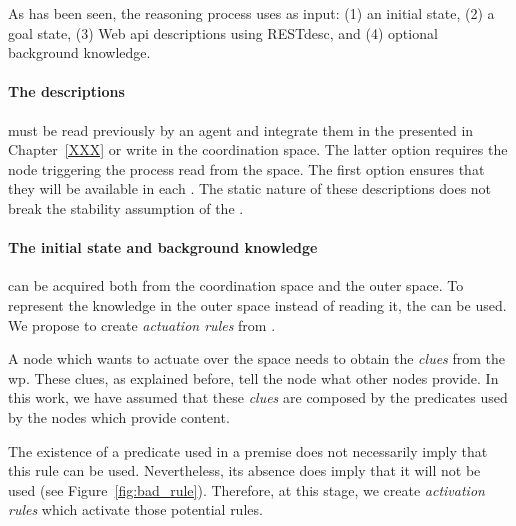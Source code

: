 As has been seen, the reasoning process uses as input:
(1) an initial state,
(2) a goal state,
(3) Web \ac{api} descriptions using RESTdesc, and
(4) optional background knowledge.


\paragraph{The descriptions} must be read previously by an agent and integrate them in the \clues{} presented in Chapter~\ref{XXX} or write in the coordination space.
The latter option requires the node triggering the process read from the space.
The first option ensures that they will be available in each \consumer{}.
The static nature of these descriptions does not break the stability assumption of the \clues{}.


\paragraph{The initial state and background knowledge} can be acquired both from the coordination space and the outer space.
To represent the knowledge in the outer space instead of reading it, the \clues{} can be used.
We propose to create \emph{actuation rules} from \clues{}.


A node which wants to actuate over the space needs to obtain the \emph{clues} from the \ac{wp}.
These clues, as explained before, tell the node what other nodes provide.
In this work, we have assumed that these \emph{clues} are composed by the predicates used by the nodes which provide content.


The existence of a predicate used in a premise does not necessarily imply that this rule can be used.
Nevertheless, its absence does imply that it will not be used (see Figure~\ref{fig:bad_rule}).
Therefore, at this stage, we create \emph{activation rules} which activate those potential rules. %


% 



